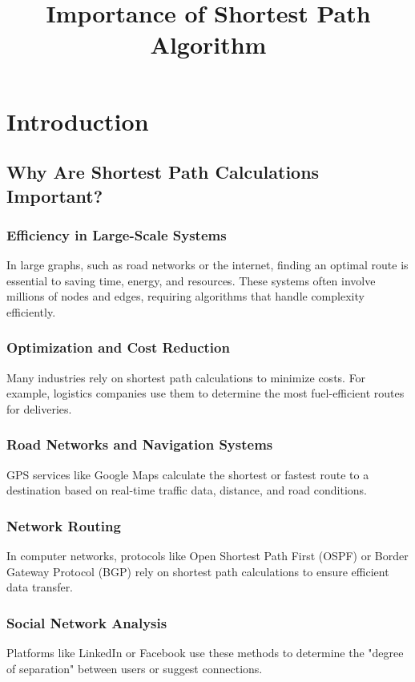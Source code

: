 \chapter{Introduction}

\title{Importance of Shortest Path Algorithm}

	\section{Why Are Shortest Path Calculations Important?}
	
	\subsection{Efficiency in Large-Scale Systems}
	In large graphs, such as road networks or the internet, finding an optimal route is essential to saving time, energy, and resources. These systems often involve millions of nodes and edges, requiring algorithms that handle complexity efficiently.
	
	\subsection{Optimization and Cost Reduction}
	Many industries rely on shortest path calculations to minimize costs. For example, logistics companies use them to determine the most fuel-efficient routes for deliveries.
	
	\subsection{Road Networks and Navigation Systems}
	GPS services like Google Maps calculate the shortest or fastest route to a destination based on real-time traffic data, distance, and road conditions.

	\subsection{Network Routing}
	In computer networks, protocols like Open Shortest Path First (OSPF) or Border Gateway Protocol (BGP) rely on shortest path calculations to ensure efficient data transfer.
	
	\subsection{Social Network Analysis}
	Platforms like LinkedIn or Facebook use these methods to determine the "degree of separation" between users or suggest connections.

